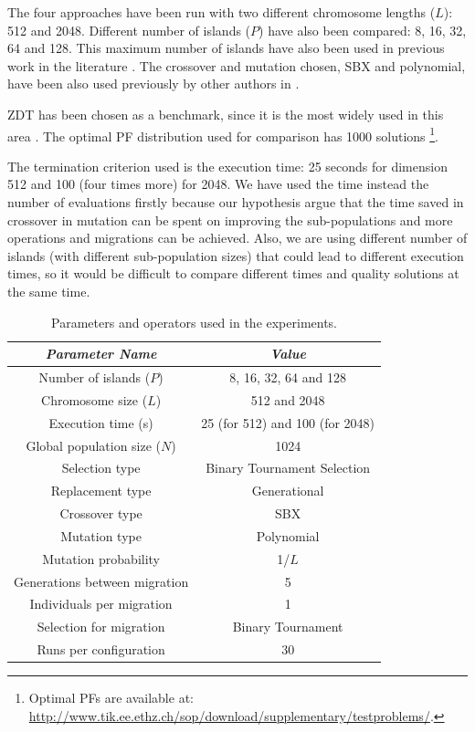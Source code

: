 \documentclass[Afour,sageh,times]{sagej}
\begin{document}
The four approaches have been run with two different chromosome lengths ($L$): 512 and 2048. Different number of islands ($P$) have also been compared: 8, 16, 32, 64 and 128. This maximum number of islands have also been  used in previous work in the literature \citep{Martens13asynchronous}. The crossover and mutation chosen, SBX and polynomial, have been also used previously by other authors in \citep{Durillo08masterslave}. 

ZDT \citep{zdt2000a} has been chosen as a benchmark, since it is the most widely used in this area \citep{Deb03distributed,Martens13asynchronous,Wang09parallel,Durillo08masterslave}. The optimal PF distribution used for comparison has 1000 solutions \footnote{Optimal PFs are available at:   \url{http://www.tik.ee.ethz.ch/sop/download/supplementary/testproblems/}.}. 





The termination criterion used is the execution time: 25 seconds for dimension 512 and 100 (four times more) for 2048. We have used the time instead the number of evaluations firstly because our hypothesis argue that the time saved in crossover in mutation can be spent on improving the sub-populations and more operations and migrations can be achieved. Also, we are using different number of islands (with different sub-population sizes) that could lead to different execution times, so it would be difficult to compare different times and quality solutions at the same time.

\begin{table}
\begin{center}
\begin{tabular}{|c|c|}
\hline
{\em Parameter Name} & {\em Value} \\ \hline
Number of islands ($P$) & 8, 16, 32, 64 and 128 \\ \hline
Chromosome size ($L$) & 512 and 2048 \\ \hline
Execution time (s) & 25 (for 512) and 100 (for 2048) \\ \hline \hline
Global population size ($N$) & 1024 \\ \hline
Selection type & Binary Tournament Selection \\ \hline
Replacement type & Generational \\ \hline 
Crossover type & SBX \\ \hline
Mutation  type & Polynomial\\ \hline
Mutation probability & 1/$L$ \\ \hline
Generations between migration & 5 \\ \hline
Individuals per migration & 1 \\ \hline
Selection for migration & Binary Tournament\\ \hline
Runs per configuration & 30 \\ \hline
\end{tabular}
\caption{Parameters and operators used in the experiments.}
\label{tab:parameters}
\end{center}
\end{table}
\end{document}
